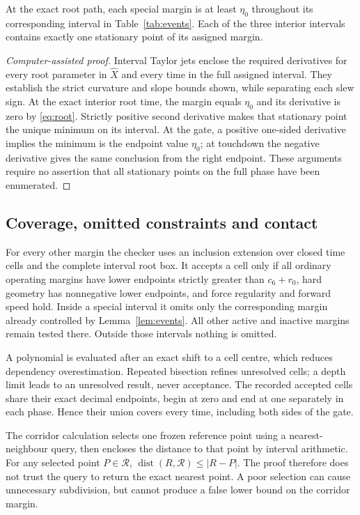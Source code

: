 \begin{lemma}\label{lem:events}
At the exact root path, each special margin is at least $\eta_0$ throughout its corresponding interval in Table~\ref{tab:events}. Each of the three interior intervals contains exactly one stationary point of its assigned margin.
\end{lemma}
\begin{proof}[Computer-assisted proof]
Interval Taylor jets enclose the required derivatives for every root parameter in $\widehat X$ and every time in the full assigned interval. They establish the strict curvature and slope bounds shown, while separating each slew sign. At the exact interior root time, the margin equals $\eta_0$ and its derivative is zero by \eqref{eq:root}. Strictly positive second derivative makes that stationary point the unique minimum on its interval. At the gate, a positive one-sided derivative implies the minimum is the endpoint value $\eta_0$; at touchdown the negative derivative gives the same conclusion from the right endpoint. These arguments require no assertion that all stationary points on the full phase have been enumerated.
\end{proof}

\subsection{Coverage, omitted constraints and contact}
For every other margin the checker uses an inclusion extension over closed time cells and the complete interval root box. It accepts a cell only if all ordinary operating margins have lower endpoints strictly greater than $c_6+r_0$, hard geometry has nonnegative lower endpoints, and force regularity and forward speed hold. Inside a special interval it omits only the corresponding margin already controlled by Lemma~\ref{lem:events}. All other active and inactive margins remain tested there. Outside those intervals nothing is omitted.

A polynomial is evaluated after an exact shift to a cell centre, which reduces dependency overestimation. Repeated bisection refines unresolved cells; a depth limit leads to an unresolved result, never acceptance. The recorded accepted cells share their exact decimal endpoints, begin at zero and end at one separately in each phase. Hence their union covers every time, including both sides of the gate.

The corridor calculation selects one frozen reference point using a nearest-neighbour query, then encloses the distance to that point by interval arithmetic. For any selected point $P\in\mathcal R$, $\operatorname{dist}(R,\mathcal R)\leq|R-P|$. The proof therefore does not trust the query to return the exact nearest point. A poor selection can cause unnecessary subdivision, but cannot produce a false lower bound on the corridor margin.

